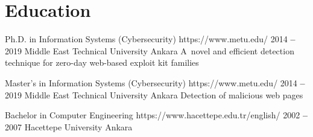 
\section{Education}


    \itemizeCVBegin[nolabel]{}
    
        \educationItem
            {Ph.D. in Information Systems (Cybersecurity)}
            {https://www.metu.edu/}
            {2014 \textbf{--} 2019}
            {Middle East Technical University}
            {Ankara}
            \small A~novel and efficient detection technique for zero-day web-based exploit kit families
            
        \educationItem
            {Master’s in Information Systems (Cybersecurity)}
            {https://www.metu.edu/}
            {2014 \textbf{--} 2019}
            {Middle East Technical University}
            {Ankara}
            \small Detection of malicious web pages

        \educationItem
            {Bachelor in Computer Engineering}
            {https://www.hacettepe.edu.tr/english/}
            {2002 \textbf{--} 2007}
            {Hacettepe University}
            {Ankara}
            
    \itemizeCVEnd
